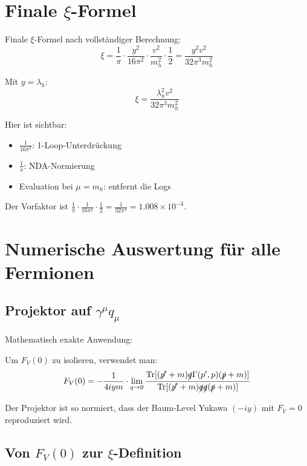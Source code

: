 	\section{Finale $\xi$-Formel}
	
	\begin{formel}
		Finale $\xi$-Formel nach vollständiger Berechnung:
		\begin{equation}
			\xi = \frac{1}{\pi} \cdot \frac{y^2}{16\pi^2} \cdot \frac{v^2}{m_h^2} \cdot \frac{1}{2} = \frac{y^2v^2}{32\pi^3m_h^2}
		\end{equation}
		
		Mit $y = \lambda_h$:
		\begin{equation}
			\boxed{\xi = \frac{\lambda_h^2v^2}{32\pi^3m_h^2}}
		\end{equation}
		
		Hier ist sichtbar:
		\begin{itemize}
			\item $\frac{1}{16\pi^2}$: 1-Loop-Unterdrückung
			\item $\frac{1}{\pi}$: NDA-Normierung
			\item Evaluation bei $\mu = m_h$: entfernt die Logs
		\end{itemize}
	\end{formel}
	Der Vorfaktor ist $\frac{1}{\pi}\cdot\frac{1}{16\pi^2}\cdot\frac{1}{2} = \frac{1}{32\pi^3} = 1.008 \times 10^{-3}$.
	
	\section{Numerische Auswertung für alle Fermionen}
	
	\subsection{Projektor auf $\gamma^\mu q_\mu$}
	
	Mathematisch exakte Anwendung:
	
	Um $F_V(0)$ zu isolieren, verwendet man:
	\begin{equation}
		F_V(0) = -\frac{1}{4iym} \cdot \lim_{q\to0} \frac{\text{Tr}[(\slashed{p'} + m)\slashed{q} \Gamma(p',p)(\slashed{p} + m)]}{\text{Tr}[(\slashed{p'} + m)\slashed{q}\slashed{q}(\slashed{p} + m)]}
	\end{equation}
	
	Der Projektor ist so normiert, dass der Baum-Level Yukawa $(-iy)$ mit $F_V = 0$ reproduziert wird.
	
	\subsection{Von $F_V(0)$ zur $\xi$-Definition}
	

